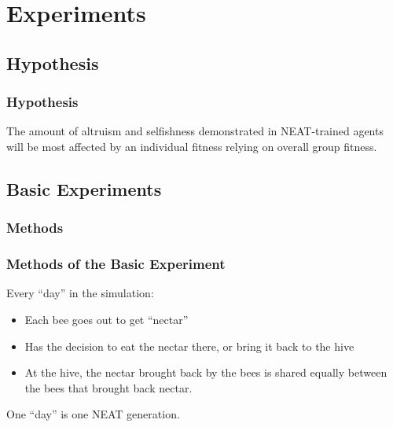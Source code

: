 \documentclass{beamer}
\begin{document}


  \section{Experiments} %
  \label{sec:experiments}
    \subsection{Hypothesis} %
    \label{sub:hypothesis}

      \begin{frame}[c]\frametitle{Hypothesis}
          
          The amount of altruism and selfishness demonstrated in NEAT-trained
          agents will be most affected by an individual fitness relying
          on overall group fitness.
      
      \end{frame}
    

    \subsection{Basic Experiments} %
    \label{sub:basic_experiments}
    
      \subsubsection{Methods} %
      \label{ssub:methods}
      
        \begin{frame}[c]\frametitle{Methods of the Basic Experiment}
          Every ``day'' in the simulation:
          \begin{itemize}
            \item Each bee goes out to get ``nectar''
            \item Has the decision to eat the nectar there, or bring it 
                  back to the hive
            \item At the hive, the nectar brought back by the bees is 
                  shared equally between the bees that brought back nectar.
            \end{itemize}
            One ``day'' is one NEAT generation.
        
        \end{frame}
\end{document}
